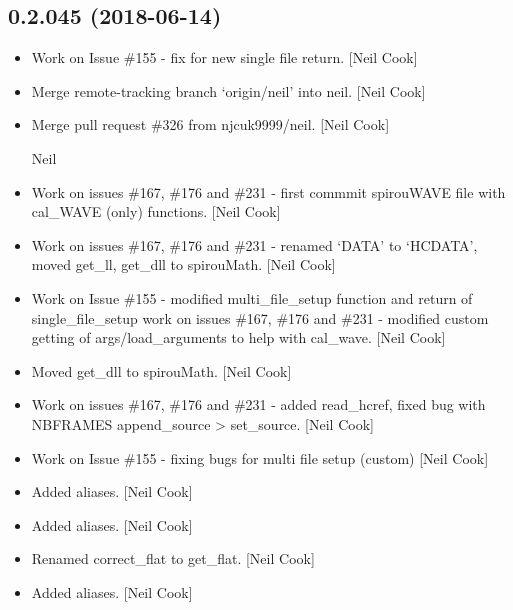 \documentclass[a4paper,10pt,english]{report}
\begin{document}
\subsection{0.2.045 (2018-06-14)}
\label{\detokenize{misc/changelog:id419}}\begin{itemize}
\item {} 
Work on Issue \#155 - fix for new single file return. {[}Neil Cook{]}

\item {} 
Merge remote-tracking branch ‘origin/neil’ into neil. {[}Neil Cook{]}

\item {} 
Merge pull request \#326 from njcuk9999/neil. {[}Neil Cook{]}

Neil

\item {} 
Work on issues \#167, \#176 and \#231 - first commmit spirouWAVE file
with cal\_WAVE (only) functions. {[}Neil Cook{]}

\item {} 
Work on issues \#167, \#176 and \#231 - renamed ‘DATA’ to ‘HCDATA’, moved
get\_ll, get\_dll to spirouMath. {[}Neil Cook{]}

\item {} 
Work on Issue \#155 - modified multi\_file\_setup function and return of
single\_file\_setup work on issues \#167, \#176 and \#231 - modified custom
getting of args/load\_arguments to help with cal\_wave. {[}Neil Cook{]}

\item {} 
Moved get\_dll to spirouMath. {[}Neil Cook{]}

\item {} 
Work on issues \#167, \#176 and \#231 - added read\_hcref, fixed bug with
NBFRAMES append\_source \textendash{}\textgreater{} set\_source. {[}Neil Cook{]}

\item {} 
Work on Issue \#155 - fixing bugs for multi file setup (custom) {[}Neil
Cook{]}

\item {} 
Added aliases. {[}Neil Cook{]}

\item {} 
Added aliases. {[}Neil Cook{]}

\item {} 
Renamed correct\_flat to get\_flat. {[}Neil Cook{]}

\item {} 
Added aliases. {[}Neil Cook{]}


\end{itemize}
\end{document}
